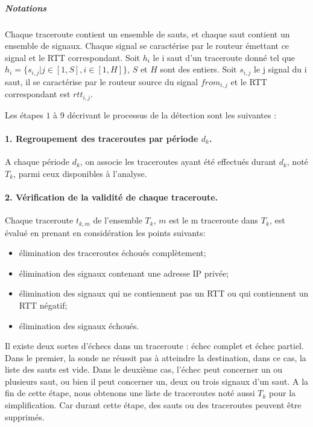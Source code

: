 \subparagraph{Notations}
Chaque traceroute contient un ensemble de sauts, et chaque saut contient un ensemble de signaux. Chaque signal se caractérise par le routeur émettant ce signal et le RTT correspondant. 
Soit  $h_i$ le i saut d'un traceroute donné tel que $h_i =\{s_{i,j} |  j \in [1, S], i\in [1,H]  \}$, $S$ et $H$ sont des entiers. Soit $ s_{i,j} $  le j signal du i saut, il se caractérise par le routeur  source du signal $from_{i,j}$ et le RTT correspondant est $rtt_{i,j}$.

Les étapes $ 1$ à $9$ décrivant le processus de la détection sont les suivantes : 

\paragraph{1. Regroupement des traceroutes  par période $d_k$.} A chaque période $d_k$, on associe les traceroutes ayant été effectués durant $d_k$, noté $T_k$, parmi ceux disponibles à l'analyse. 


\paragraph{2. Vérification de la validité de chaque traceroute.} 
Chaque traceroute $t_{k,m}$ de l'ensemble $T_k$, $m$  est le m  traceroute dans $T_k$,  est évalué en prenant en considération  les points suivants:
\begin{itemize}
	\item élimination des traceroutes échoués complètement;
	\item élimination des signaux contenant une adresse IP privée;
	\item élimination des signaux qui ne contiennent pas un RTT ou  qui contiennent un RTT négatif;
	\item élimination des signaux échoués.
\end{itemize}

Il existe deux sortes d'échecs dans un traceroute : échec complet et échec partiel. Dans le premier,   la sonde  ne réussit pas à atteindre la destination, dans ce cas, la liste des sauts est vide. Dans le deuxième cas, l'échec peut concerner un ou plusieurs saut, ou bien il peut concerner un, deux ou trois signaux d'un saut. A la fin de cette étape, nous obtenons une liste de traceroutes noté aussi $T_k$ pour la simplification. Car durant cette étape, des sauts ou des traceroutes peuvent être supprimés.

